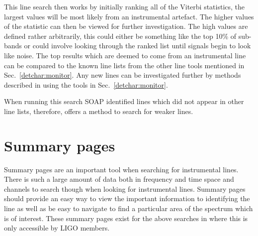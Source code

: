 This line search then works by initially ranking all of the Viterbi statistics, the largest values will be most likely from an instrumental artefact. 
The higher values of the statistic can then be viewed for further investigation. The high values are defined rather arbitrarily, this could either be something like the top 10\% of sub-bands or could involve looking through the ranked list until signals begin to look like noise. 
The top results which are deemed to come from an instrumental line can be compared to the known line lists from the other line tools mentioned in Sec.~\ref{detchar:monitor}.
Any new lines can be investigated further by methods described in \citep{covas2018IdentificationMitigation} using the tools in Sec.~\ref{detchar:monitor}.

When running this search SOAP identified lines which did not appear in other line lists, therefore, offers a method to search for weaker lines. 


\section{\label{detchar:summary}Summary pages}

Summary pages are an important tool when searching for instrumental lines. 
There is such a large amount of data both in frequency and time space and channels to search though when looking for instrumental lines.
Summary pages should provide an easy way to view the important information to identifying the line as well as be easy to navigate to find a particular area of the spectrum which is of interest. 
These summary pages exist for the above searches in \citep{bayleyHome} where this is only accessible by \ac{LIGO} members.

